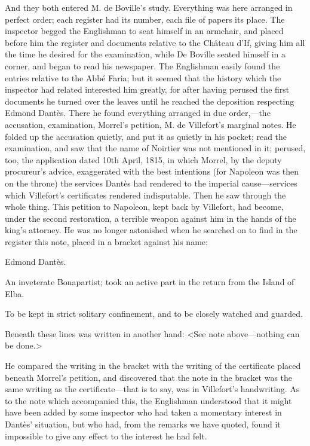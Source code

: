 And they both entered M. de Boville's study. Everything was here arranged in perfect order; each register had its number, each file of papers its place. The inspector begged the Englishman to seat himself in an armchair, and placed before him the register and documents relative to the Château d'If, giving him all the time he desired for the examination, while De Boville seated himself in a corner, and began to read his newspaper. The Englishman easily found the entries relative to the Abbé Faria; but it seemed that the history which the inspector had related interested him greatly, for after having perused the first documents he turned over the leaves until he reached the deposition respecting Edmond Dantès. There he found everything arranged in due order,—the accusation, examination, Morrel's petition, M. de Villefort's marginal notes. He folded up the accusation quietly, and put it as quietly in his pocket; read the examination, and saw that the name of Noirtier was not mentioned in it; perused, too, the application dated 10th April, 1815, in which Morrel, by the deputy procureur's advice, exaggerated with the best intentions (for Napoleon was then on the throne) the services Dantès had rendered to the imperial cause—services which Villefort's certificates rendered indisputable. Then he saw through the whole thing. This petition to Napoleon, kept back by Villefort, had become, under the second restoration, a terrible weapon against him in the hands of the king's attorney. He was no longer astonished when he searched on to find in the register this note, placed in a bracket against his name: 

 Edmond Dantès. 

 An inveterate Bonapartist; took an active part in the return from the Island of Elba. 

 To be kept in strict solitary confinement, and to be closely watched and guarded. 

 Beneath these lines was written in another hand: <See note above—nothing can be done.> 

 He compared the writing in the bracket with the writing of the certificate placed beneath Morrel's petition, and discovered that the note in the bracket was the same writing as the certificate—that is to say, was in Villefort's handwriting.  As to the note which accompanied this, the Englishman understood that it might have been added by some inspector who had taken a momentary interest in Dantès' situation, but who had, from the remarks we have quoted, found it impossible to give any effect to the interest he had felt. 

